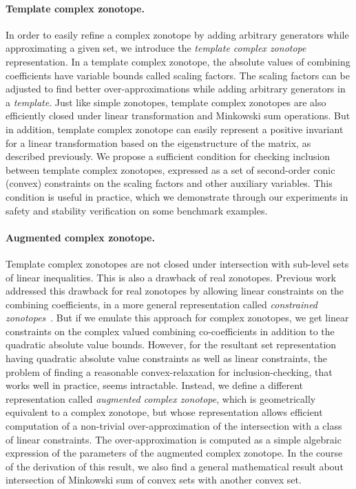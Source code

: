 \documentclass[11pt,a4paper,twoside,openright]{article}
\begin{document}
\paragraph{Template complex zonotope.}  In order to easily refine a
complex zonotope by adding arbitrary generators while approximating a
given set, we introduce the {\it template complex zonotope}
representation.  In a template complex zonotope, the absolute values
of combining coefficients have variable bounds called scaling factors.
The scaling factors can be adjusted to find better over-approximations
while adding arbitrary generators in a {\it template}.  Just like
simple zonotopes, template complex zonotopes are also efficiently
closed under linear transformation and Minkowski sum operations.  But
in addition, template complex zonotope can easily represent a positive
invariant for a linear transformation based on the eigenstructure of
the matrix, as described previously.  We propose a sufficient
condition for checking inclusion between template complex zonotopes,
expressed as a set of second-order conic (convex) constraints on the
scaling factors and other auxiliary variables.  This condition is
useful in practice, which we demonstrate through our experiments in
safety and stability verification on some benchmark examples.

\paragraph{Augmented complex zonotope.}  Template complex
zonotopes are not closed under intersection with sub-level sets of
linear inequalities.  This is also a drawback of real zonotopes.
Previous work addressed this drawback for real zonotopes by allowing
linear constraints on the combining coefficients, in a more general
representation called {\it constrained
  zonotopes}~\cite{scott2016constrained}.  But if we emulate this
approach for complex zonotopes, we get linear constraints on the
complex valued combining co-coefficients in addition to the quadratic
absolute value bounds.  However, for the resultant set representation
having quadratic absolute value constraints as well as linear
constraints, the problem of finding a reasonable convex-relaxation for
inclusion-checking, that works well in practice, seems intractable.
Instead, we define a different representation called {\it augmented
  complex zonotope}, which is geometrically equivalent to a complex
zonotope, but whose representation allows efficient computation of a
non-trivial over-approximation of the intersection with a class of
linear constraints.  The over-approximation is computed as a simple
algebraic expression of the parameters of the augmented complex
zonotope.  In the course of the derivation of this result, we also
find a general mathematical result about intersection of Minkowski sum
of convex sets with another convex set.
\end{document}
